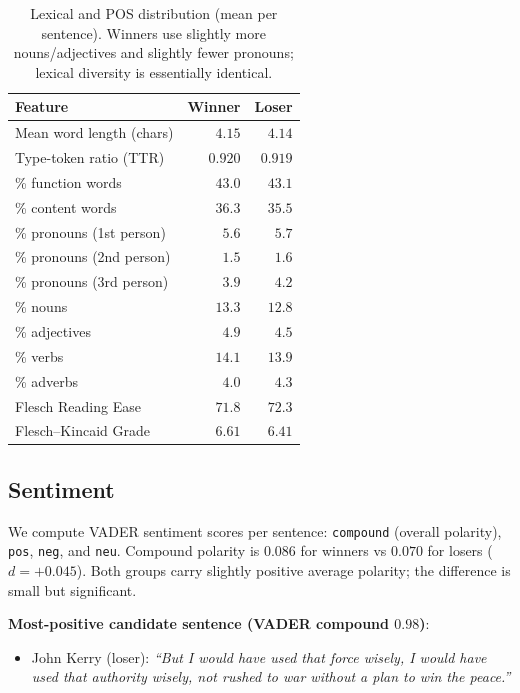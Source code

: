 \documentclass[journal]{IEEEtran}
\newcommand{\loser}{\textcolor[HTML]{B71C1C}}
\begin{document}
\begin{table}[t]
\caption{Lexical and POS distribution (mean per sentence).
Winners use slightly more nouns/adjectives and slightly fewer
pronouns; lexical diversity is essentially identical.}
\label{tab:lexical}
\centering
\begin{tabular}{lrr}
\toprule
Feature                        & Winner  & Loser \\
\midrule
Mean word length (chars)       & $4.15$  & $4.14$ \\
Type-token ratio (TTR)         & $0.920$ & $0.919$ \\
\% function words              & $43.0$  & $43.1$ \\
\% content words               & $36.3$  & $35.5$ \\
\% pronouns (1st person)       & $5.6$   & $5.7$ \\
\% pronouns (2nd person)       & $1.5$   & $1.6$ \\
\% pronouns (3rd person)       & $3.9$   & $4.2$ \\
\% nouns                       & $13.3$  & $12.8$ \\
\% adjectives                  & $4.9$   & $4.5$ \\
\% verbs                       & $14.1$  & $13.9$ \\
\% adverbs                     & $4.0$   & $4.3$ \\
\midrule
Flesch Reading Ease            & $71.8$  & $72.3$ \\
Flesch--Kincaid Grade          & $6.61$  & $6.41$ \\
\bottomrule
\end{tabular}
\end{table}

\subsection{Sentiment}
We compute VADER \cite{hutto2014vader} sentiment scores per sentence:
\texttt{compound} (overall polarity), \texttt{pos}, \texttt{neg}, and
\texttt{neu}. Compound polarity is $0.086$ for winners vs $0.070$ for
losers ($d = +0.045$). Both groups carry slightly positive average
polarity; the difference is small but significant.

\noindent\textbf{Most-positive candidate sentence (VADER compound $0.98$)}:
\begin{itemize}\itemsep0pt
  \item \loser{John Kerry (loser):} \emph{``But I would have used that
        force wisely, I would have used that authority wisely, not
        rushed to war without a plan to win the peace.''}
\end{itemize}
\end{document}
